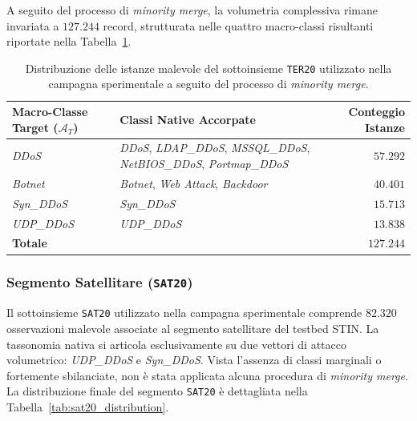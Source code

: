 A seguito del processo di \textit{minority merge}, la volumetria complessiva rimane invariata a $127.244$ record, strutturata nelle quattro macro-classi risultanti riportate nella Tabella~\ref{tab:ter20_distribution}.

\begin{table}[H]
    \centering
    \small
    \caption{Distribuzione delle istanze malevole del sottoinsieme \texttt{TER20} utilizzato nella campagna sperimentale a seguito del processo di \textit{minority merge}.}
    \label{tab:ter20_distribution}
    \begin{tabular}{l p{6cm} r}
        \toprule
        \textbf{Macro-Classe Target ($\mathcal{A}_T$)} & \textbf{Classi Native Accorpate} & \textbf{Conteggio Istanze} \\
        \midrule
        \textit{DDoS} & \textit{DDoS}, \textit{LDAP\_DDoS}, \textit{MSSQL\_DDoS}, \textit{NetBIOS\_DDoS}, \textit{Portmap\_DDoS} & $57.292$ \\
        \textit{Botnet} & \textit{Botnet}, \textit{Web Attack}, \textit{Backdoor} & $40.401$ \\
        \textit{Syn\_DDoS} & \textit{Syn\_DDoS} & $15.713$ \\
        \textit{UDP\_DDoS} & \textit{UDP\_DDoS} & $13.838$ \\
        \hline
        \textbf{Totale} & & $\mathbf{127.244}$ \\
        \bottomrule
    \end{tabular}
\end{table}

\subsubsection{Segmento Satellitare (\texttt{SAT20})}
Il sottoinsieme \texttt{SAT20} utilizzato nella campagna sperimentale comprende $82.320$ osservazioni malevole associate al segmento satellitare del testbed STIN. 
La tassonomia nativa si articola esclusivamente su due vettori di attacco volumetrico: \textit{UDP\_DDoS} e \textit{Syn\_DDoS}. 
Vista l'assenza di classi marginali o fortemente sbilanciate, non è stata applicata alcuna procedura di \textit{minority merge}. 
La distribuzione finale del segmento \texttt{SAT20} è dettagliata nella Tabella~\ref{tab:sat20_distribution}.


